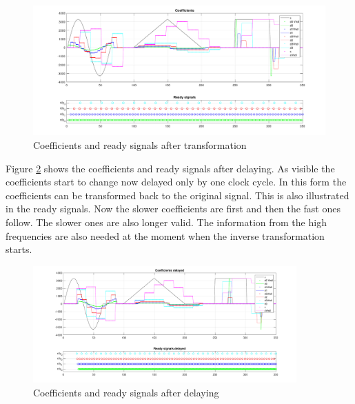 \begin{refsection}
\begin{figure}
	\centering
	\includegraphics[width=\textwidth]{papers/fpga/images/coefs.pdf}
	\caption{Coefficients and ready signals after transformation \label{fpga:fig:coeff}}
\end{figure}
Figure \ref{fpga:fig:coeff_delayed} shows the coefficients and ready signals after delaying. 
As visible the coefficients start to change now delayed only by one clock cycle. 
In this form the coefficients can be transformed back to the original signal. 
This is also illustrated in the ready signals.
Now the slower coefficients are first and then the fast ones follow.
The slower ones are also longer valid.
The information from the high frequencies are also needed at the moment when the inverse transformation starts.  
\begin{figure}[h]
	\centering
	\includegraphics[width=0.9\textwidth]{papers/fpga/images/coefs_delayed.pdf}
	\caption{Coefficients and ready signals after delaying \label{fpga:fig:coeff_delayed}}
\end{figure}


\end{refsection}
